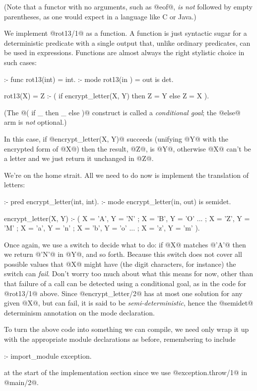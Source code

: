 (Note that a functor with no arguments, such as @eof@, \emph{is not}
followed by empty parentheses, as one would expect in a language like C or
Java.)

We implement @rot13/1@ as a function.  A function is just syntactic sugar
for a deterministic predicate with a single output that, unlike ordinary
predicates, can be used in expressions.  Functions are almost always the
right stylistic choice in such cases:
\begin{myverbatim}
:- func rot13(int) = int.
:- mode rot13(in ) = out is det.

rot13(X) = Z :-
    ( if   encrypt_letter(X, Y)
      then Z = Y
      else Z = X
    ).
\end{myverbatim}
(The @( if _ then  _ else )@ construct is called a \emph{conditional goal};
the @else@ arm is \emph{not} optional.)

In this case, if @encrypt_letter(X, Y)@ succeeds (unifying @Y@ with the
encrypted form of @X@) then the result, @Z@, is @Y@, otherwise @X@ can't
be a letter and we just return it unchanged in @Z@.

We're on the home strait.  All we need to do now is implement the 
translation of letters:
\begin{myverbatim}
:- pred encrypt_letter(int, int).
:- mode encrypt_letter(in,  out) is semidet.

encrypt_letter(X, Y) :-
    (   X = 'A', Y = 'N'
    ;   X = 'B', Y = 'O'
    ...
    ;   X = 'Z', Y = 'M'
    ;   X = 'a', Y = 'n'
    ;   X = 'b', Y = 'o'
    ...
    ;   X = 'z', Y = 'm'
    ).
\end{myverbatim}
Once again, we use a switch to decide what to do: if @X@ matches @'A'@
then we return @'N'@ in @Y@, and so forth.
Because this switch does not cover all possible values that @X@ might
have (the digit characters, for instance)
the switch can \emph{fail}.  Don't worry too much about what
this means for now, other than that failure of a call can be detected
using a conditional goal, as in the code for @rot13/1@ above.
Since @encrypt_letter/2@ has at most one solution for any given @X@, but can
fail, it is said to be \emph{semi-deterministic}, hence the @semidet@
determinism annotation on the mode declaration.

To turn the above code into something we can compile, we need only wrap
it up with the appropriate module declarations as before, remembering to
include
\begin{myverbatim}
:- import_module exception.
\end{myverbatim}
at the start of the implementation section since we use
@exception.throw/1@ in @main/2@.

